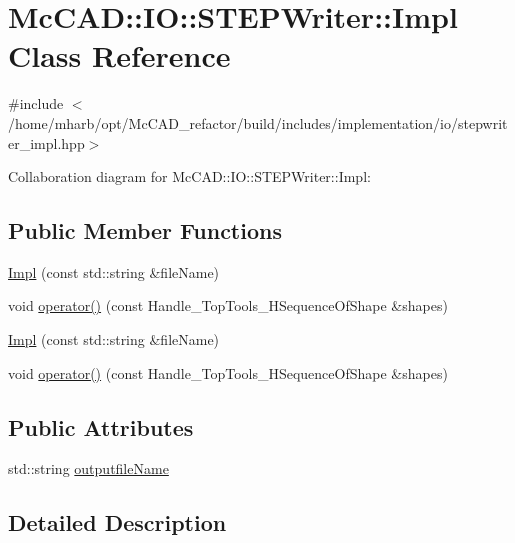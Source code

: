\hypertarget{classMcCAD_1_1IO_1_1STEPWriter_1_1Impl}{}\section{Mc\+C\+AD\+:\+:IO\+:\+:S\+T\+E\+P\+Writer\+:\+:Impl Class Reference}
\label{classMcCAD_1_1IO_1_1STEPWriter_1_1Impl}


{\ttfamily \#include $<$/home/mharb/opt/\+Mc\+C\+A\+D\+\_\+refactor/build/includes/implementation/io/stepwriter\+\_\+impl.\+hpp$>$}



Collaboration diagram for Mc\+C\+AD\+:\+:IO\+:\+:S\+T\+E\+P\+Writer\+:\+:Impl\+:
\subsection*{Public Member Functions}
\begin{DoxyCompactItemize}
\item 
\hyperlink{classMcCAD_1_1IO_1_1STEPWriter_1_1Impl_a8275f8185571fed985a30b1813e3ff03}{Impl} (const std\+::string \&file\+Name)
\item 
void \hyperlink{classMcCAD_1_1IO_1_1STEPWriter_1_1Impl_a0ffef02c0b5c8d9d2ef6dd8bba026ec1}{operator()} (const Handle\+\_\+\+Top\+Tools\+\_\+\+H\+Sequence\+Of\+Shape \&shapes)
\item 
\hyperlink{classMcCAD_1_1IO_1_1STEPWriter_1_1Impl_a8275f8185571fed985a30b1813e3ff03}{Impl} (const std\+::string \&file\+Name)
\item 
void \hyperlink{classMcCAD_1_1IO_1_1STEPWriter_1_1Impl_a0ffef02c0b5c8d9d2ef6dd8bba026ec1}{operator()} (const Handle\+\_\+\+Top\+Tools\+\_\+\+H\+Sequence\+Of\+Shape \&shapes)
\end{DoxyCompactItemize}
\subsection*{Public Attributes}
\begin{DoxyCompactItemize}
\item 
std\+::string \hyperlink{classMcCAD_1_1IO_1_1STEPWriter_1_1Impl_ae943ccd3f778c6c211f67be535fdc93f}{outputfile\+Name}
\end{DoxyCompactItemize}


\subsection{Detailed Description}


